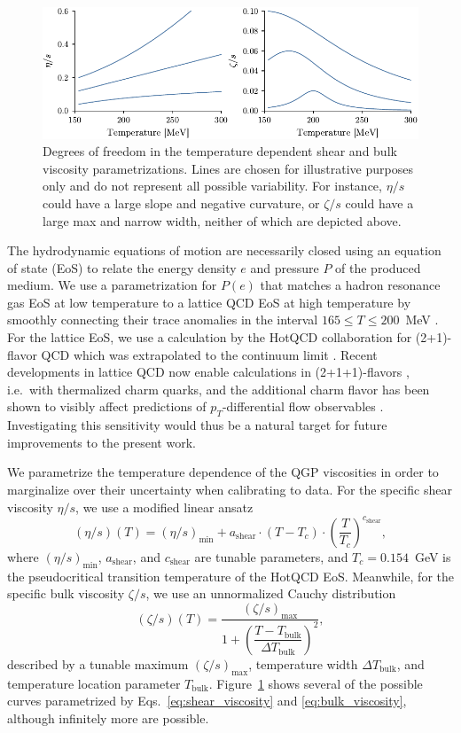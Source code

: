 \documentclass[aps,prc,reprint,amsmath,nofootinbib]{revtex4-1}
\newcommand{\smin}{{(\eta/s)_\mathrm{min}}}
\newcommand{\sslope}{{a_\mathrm{shear}}}
\newcommand{\scrv}{{c_\mathrm{shear}}}
\newcommand{\bmax}{{(\zeta/s)_\mathrm{max}}}
\newcommand{\bloc}{{T_\text{bulk}}}
\newcommand{\bwidth}{{\Delta T_\text{bulk}}}
\begin{document}
\begin{figure}[t]
  \includegraphics{viscosity_dof}
  \caption{Degrees of freedom in the temperature dependent shear and bulk viscosity parametrizations. Lines are chosen for illustrative purposes only and do not represent all possible variability. For instance, $\eta/s$ could have a large slope and negative curvature, or $\zeta/s$ could have a large max and narrow width, neither of which are depicted above.}
  \label{fig:viscosity_dof}
\end{figure}

The hydrodynamic equations of motion are necessarily closed using an equation of state (EoS) to relate the energy density $e$ and pressure $P$ of the produced medium.
We use a parametrization for $P(e)$ that matches a hadron resonance gas EoS at low temperature to a lattice QCD EoS at high temperature by smoothly connecting their trace anomalies in the interval
$165 \le T \le 200$~MeV \cite{Bernhard:2018hnz}.
For the lattice EoS, we use a calculation by the HotQCD collaboration for (2+1)-flavor QCD which was extrapolated to the continuum limit \cite{Bazavov:2014pvz}. Recent developments in lattice QCD now enable calculations in (2+1+1)-flavors \cite{Borsanyi:2016ksw}, i.e.\ with thermalized charm quarks, and the additional charm flavor has been shown to visibly affect predictions of $p_T$-differential flow observables \cite{Noronha-Hostler:2018zxc}.
Investigating this sensitivity would thus be a natural target for future improvements to the present work.

We parametrize the temperature dependence of the QGP viscosities in order to marginalize over their uncertainty when calibrating to data.
For the specific shear viscosity $\eta/s$, we use a modified linear ansatz
\begin{equation}
  \label{eq:shear_viscosity}
  (\eta/s)(T) = \smin + \sslope \cdot(T - T_c)\cdot \left ( \frac{T}{T_c} \right)^\scrv,
\end{equation}
where $\smin$, $\sslope$, and $\scrv$ are tunable parameters, and $T_c=0.154$~GeV is the pseudocritical transition temperature of the HotQCD EoS.
Meanwhile, for the specific bulk viscosity $\zeta/s$, we use an unnormalized Cauchy distribution
\begin{equation}
  \label{eq:bulk_viscosity}
  (\zeta/s)(T) = \frac{\bmax}{1 + \left(\dfrac{T - \bloc}{\bwidth}\right)^2},
\end{equation}
described by a tunable maximum $\bmax$, temperature width $\bwidth$, and temperature location parameter $\bloc$.
Figure~\ref{fig:viscosity_dof} shows several of the possible curves parametrized by Eqs.~\eqref{eq:shear_viscosity} and \eqref{eq:bulk_viscosity}, although infinitely more are possible.
\end{document}
